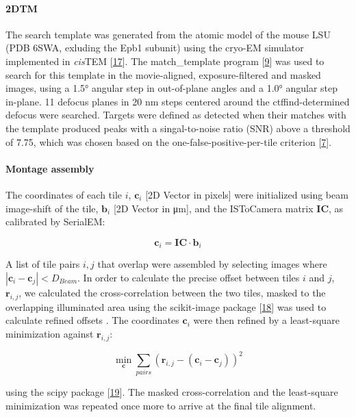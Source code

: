 \documentclass[
]{article}
\begin{document}
\hypertarget{dtm}{%
\paragraph{2DTM}\label{dtm}}

The search template was generated from the atomic model of the mouse LSU
(PDB 6SWA, exluding the Epb1 subunit) using the cryo-EM simulator implemented in \emph{cis}TEM
{[}\protect\hyperlink{ref-q2PSamkS}{17}{]}. The
match\_template program {[}\protect\hyperlink{ref-10bXZuF3G}{9}{]} was used to search for this
template in the movie-aligned, exposure-filtered and masked images, using a 1.5°
angular step in out-of-plane angles and a 1.0° angular step in-plane. 11 defocus
planes in 20 nm steps centered around the ctffind-determined defocus were searched. Targets
were defined as detected when their matches with the template produced peaks
with a singal-to-noise ratio (SNR) above a threshold of 7.75, which was chosen
based on the one-false-positive-per-tile criterion {[}\protect\hyperlink{ref-Ynb3IP6I}{7}{]}.

\hypertarget{montage-assembly}{%
\paragraph{Montage assembly}\label{montage-assembly}}

The coordinates of each tile \(i\),
\(\mathbf{c}_{i}\) {[}2D Vector in pixels{]} were initialized using beam image-shift of the tile, \(\mathbf{b}_i\) {[}2D Vector in μm{]},
and the ISToCamera matrix \(\mathbf{IC}\), as calibrated by SerialEM:

\[\mathbf{c}_{i} = \mathbf{IC} \cdot \mathbf{b}_i\]

A list of tile pairs \(i,j\) that overlap were assembled by selecting images where
\(|\mathbf{c}_i-\mathbf{c}_j| < D_{Beam}\). In order to calculate the precise offset between tiles \(i\) and \(j\), \(\mathbf{r}_{i,j}\), we calculated the cross-correlation between the two tiles, masked to the overlapping illuminated area using the scikit-image
package {[}\protect\hyperlink{ref-stvWEJeu}{18}{]} was used to calculate refined offsets . The coordinates \(\mathbf{c}_{i}\) were then refined by a least-square minimization against \(\mathbf{r}_{i,j}\):

\[ \displaystyle{\min_{\mathbf{c}} \sum_{pairs}{(\mathbf{r}_{i,j} - (\mathbf{c}_i-\mathbf{c}_j))^2}}\]

using the scipy package {[}\protect\hyperlink{ref-8Miti2Gz}{19}{]}. The masked cross-correlation and the least-square minimization was repeated once more to arrive at the final tile alignment.
\end{document}

